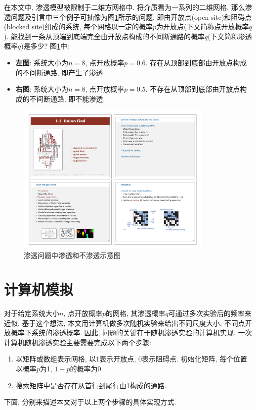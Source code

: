 \documentclass[11pt,a4paper,boxed]{caspset}
\begin{document}
在本文中, 渗透模型被限制于二维方网格中. 将介质看为一系列的二维网格, 那么渗透问题及引言中三个例子可抽像为图\ref{percolation}所示的问题, 即由开放点(open site)和阻碍点(blocked site)组成的系统, 每个网格以一定的概率$p$为开放点(下文简称点开放概率$q$). 能找到一条从顶端到底端完全由开放点构成的不间断通路的概率$q$(下文简称渗透概率$q$)是多少?
图\ref{percolation}中:
\begin{itemize}
\item \textbf{左图}: 系统大小为$n=8$, 点开放概率$p=0.6$. 存在从顶部到底部由开放点构成的不间断通路, 即产生了渗透.
\item \textbf{右图}: 系统大小为$n=8$, 点开放概率$p=0.5$. 不存在从顶部到底部由开放点构成的不间断通路, 即不能渗透.
\end{itemize}
\begin{figure}[!htb]
\centering
\includegraphics[width=0.85\textwidth]{fig01.pdf}
\caption{\label{percolation}渗透问题中渗透和不渗透示意图}
\end{figure}

\section{计算机模拟}
对于给定系统大小$n$, 点开放概率$p$的网格, 其渗透概率$q$可通过多次实验后的频率来近似. 基于这个想法, 本文用计算机做多次随机实验来给出不同尺度大小, 不同点开放概率下系统的渗透概率. 因此, 问题的关键在于随机渗透实验的计算机实现. 一次计算机随机渗透实验主要需要完成以下两个步骤:
\begin{enumerate}
\item 以矩阵或数组表示网格, 以1表示开放点, 0表示阻碍点. 初始化矩阵, 每个位置以概率$p$为1, $1-p$的概率为0.
\item 搜索矩阵中是否存在从首行到尾行由1构成的通路.
\end{enumerate}
下面, 分别来描述本文对于以上两个步骤的具体实现方式.
\end{document}

